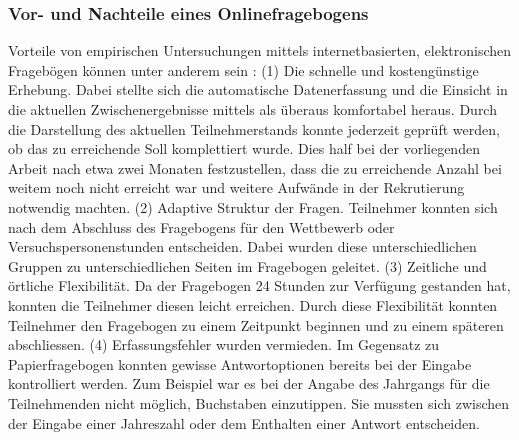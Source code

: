 \subsubsection{Vor- und Nachteile eines Onlinefragebogens}
Vorteile von empirischen Untersuchungen mittels internetbasierten, elektronischen Fragebögen können unter anderem sein \cite{Rey2009}: (1) Die schnelle und kostengünstige Erhebung. Dabei stellte sich die automatische Datenerfassung und die Einsicht in die aktuellen Zwischenergebnisse mittels  als überaus komfortabel heraus. Durch die Darstellung des aktuellen Teilnehmerstands konnte jederzeit geprüft werden, ob das zu erreichende Soll komplettiert wurde. Dies half bei der vorliegenden Arbeit nach etwa zwei Monaten festzustellen, dass die zu erreichende Anzahl bei weitem noch nicht erreicht war und weitere Aufwände in der Rekrutierung notwendig machten. (2) Adaptive Struktur der Fragen. Teilnehmer konnten sich nach dem Abschluss des Fragebogens für den Wettbewerb oder Versuchspersonenstunden entscheiden. Dabei wurden diese unterschiedlichen Gruppen zu unterschiedlichen Seiten im Fragebogen geleitet. (3) Zeitliche und örtliche Flexibilität. Da der Fragebogen 24 Stunden zur Verfügung gestanden hat, konnten die Teilnehmer diesen leicht erreichen. Durch diese Flexibilität konnten Teilnehmer den Fragebogen zu einem Zeitpunkt beginnen und zu einem späteren abschliessen. (4) Erfassungsfehler wurden vermieden. Im Gegensatz zu Papierfragebogen konnten gewisse Antwortoptionen bereits bei der Eingabe kontrolliert werden. Zum Beispiel war es bei der Angabe des Jahrgangs für die Teilnehmenden nicht möglich, Buchstaben einzutippen. Sie mussten sich zwischen der Eingabe einer Jahreszahl oder dem Enthalten einer Antwort entscheiden. 


